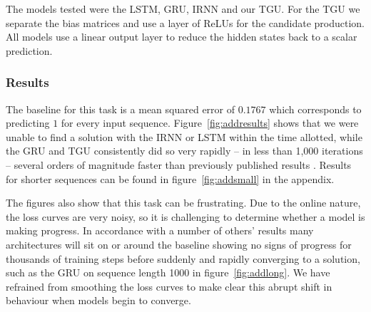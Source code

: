 The models tested were the LSTM, GRU, IRNN \autocite{Le2015} and our TGU. 
For the TGU we separate the bias matrices and use a layer of ReLUs for the candidate
production. All models use a linear output layer to reduce the hidden states back to a scalar prediction.

\subsubsection{Results}
The baseline for this task is a mean squared error of \(0.1767\) which corresponds to predicting
\(1\) for every input sequence.
Figure~\ref{fig:addresults} shows that we were unable to find a solution with the IRNN or LSTM within
the time allotted, while the GRU and TGU consistently did so very rapidly -- in less than 1,000
iterations -- several orders of magnitude faster than previously published results 
\autocite{Le2015, Arjovsky2015, Henaff2016}. 
Results for shorter sequences can be found in figure~\ref{fig:addsmall} in the appendix.

The figures also show that this task can be frustrating. Due to the online nature, the loss
curves are very noisy, so it is challenging to determine whether a model is making progress.
In accordance with a number of others' results \autocite{Le2015, Arjovsky2015} many
architectures will sit on or around the baseline showing no signs of progress for thousands of
training steps before suddenly and rapidly converging to a solution, such as
the GRU on sequence length 1000 in figure~\ref{fig:addlong}. 
We have refrained from smoothing the loss curves to make clear this abrupt shift in behaviour when models begin
to converge.

